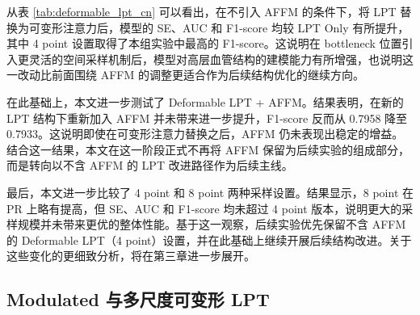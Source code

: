 \documentclass[a4paper,12pt]{article}
\begin{document}
\begin{table}[htbp]
\centering
\caption{可变形 LPT 相关实验结果对比}
\label{tab:deformable_lpt_cn}
\end{table}

从表 \ref{tab:deformable_lpt_cn} 可以看出，在不引入 AFFM 的条件下，将 LPT 替换为可变形注意力后，模型的 SE、AUC 和 F1-score 均较 LPT Only 有所提升，其中 4 point 设置取得了本组实验中最高的 F1-score。这说明在 bottleneck 位置引入更灵活的空间采样机制后，模型对高层血管结构的建模能力有所增强，也说明这一改动比前面围绕 AFFM 的调整更适合作为后续结构优化的继续方向。

在此基础上，本文进一步测试了 Deformable LPT + AFFM。结果表明，在新的 LPT 结构下重新加入 AFFM 并未带来进一步提升，F1-score 反而从 0.7958 降至 0.7933。这说明即使在可变形注意力替换之后，AFFM 仍未表现出稳定的增益。结合这一结果，本文在这一阶段正式不再将 AFFM 保留为后续实验的组成部分，而是转向以不含 AFFM 的 LPT 改进路径作为后续主线。

最后，本文进一步比较了 4 point 和 8 point 两种采样设置。结果显示，8 point 在 PR 上略有提高，但 SE、AUC 和 F1-score 均未超过 4 point 版本，说明更大的采样规模并未带来更优的整体性能。基于这一观察，后续实验优先保留不含 AFFM 的 Deformable LPT（4 point）设置，并在此基础上继续开展后续结构改进。关于这些变化的更细致分析，将在第三章进一步展开。

\subsection{Modulated 与多尺度可变形 LPT}
\end{document}
